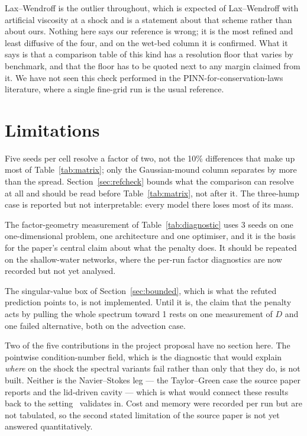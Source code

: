 \documentclass[11pt]{article}
\begin{document}
Lax--Wendroff is the outlier throughout, which is expected of Lax--Wendroff
with artificial viscosity at a shock and is a statement about that scheme
rather than about ours. Nothing here says our reference is wrong; it is the
most refined and least diffusive of the four, and on the wet-bed column it is
confirmed. What it says is that a comparison table of this kind has a
resolution floor that varies by benchmark, and that the floor has to be
quoted next to any margin claimed from it. We have not seen this check
performed in the PINN-for-conservation-laws literature, where a single
fine-grid run is the usual reference.

\section{Limitations}

Five seeds per cell resolve a factor of two, not the 10\% differences that
make up most of Table~\ref{tab:matrix}; only the Gaussian-mound column
separates by more than the spread. Section~\ref{sec:refcheck} bounds what the
comparison can resolve at all and should be read before
Table~\ref{tab:matrix}, not after it. The three-hump case is reported but not
interpretable: every model there loses most of its mass.

The factor-geometry measurement of Table~\ref{tab:diagnostic} uses 3 seeds on
one one-dimensional problem, one architecture and one optimiser, and it is the
basis for the paper's central claim about what the penalty does. It should be
repeated on the shallow-water networks, where the per-run factor diagnostics
are now recorded but not yet analysed.

The singular-value box of Section~\ref{sec:bounded}, which is what the refuted
prediction points to, is not implemented. Until it is, the claim that the
penalty acts by pulling the whole spectrum toward 1 rests on one measurement
of $D$ and one failed alternative, both on the advection case.

Two of the five contributions in the project proposal have no section here.
The pointwise condition-number field, which is the diagnostic that would
explain \emph{where} on the shock the spectral variants fail rather than only
that they do, is not built. Neither is the Navier--Stokes leg --- the
Taylor--Green case the source paper reports and the lid-driven cavity --- which
is what would connect these results back to the setting~\cite{wang2026cnpinn}
validates in. Cost and memory were recorded per run but are not tabulated, so
the second stated limitation of the source paper is not yet answered
quantitatively.
\end{document}

